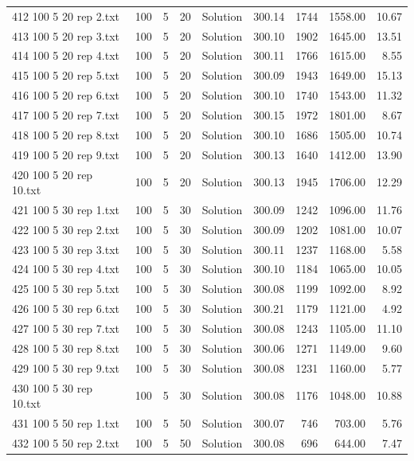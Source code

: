 \begin{longtable}{lrrllrrrr}
412 100 5 20 rep 2.txt & 100 & 5 & 20 & Solution & 300.14 & 1744 & 1558.00 & 10.67\\
413 100 5 20 rep 3.txt & 100 & 5 & 20 & Solution & 300.10 & 1902 & 1645.00 & 13.51\\
414 100 5 20 rep 4.txt & 100 & 5 & 20 & Solution & 300.11 & 1766 & 1615.00 &  8.55\\
415 100 5 20 rep 5.txt & 100 & 5 & 20 & Solution & 300.09 & 1943 & 1649.00 & 15.13\\
416 100 5 20 rep 6.txt & 100 & 5 & 20 & Solution & 300.10 & 1740 & 1543.00 & 11.32\\
417 100 5 20 rep 7.txt & 100 & 5 & 20 & Solution & 300.15 & 1972 & 1801.00 &  8.67\\
418 100 5 20 rep 8.txt & 100 & 5 & 20 & Solution & 300.10 & 1686 & 1505.00 & 10.74\\
419 100 5 20 rep 9.txt & 100 & 5 & 20 & Solution & 300.13 & 1640 & 1412.00 & 13.90\\
420 100 5 20 rep 10.txt & 100 & 5 & 20 & Solution & 300.13 & 1945 & 1706.00 & 12.29\\
421 100 5 30 rep 1.txt & 100 & 5 & 30 & Solution & 300.09 & 1242 & 1096.00 & 11.76\\
422 100 5 30 rep 2.txt & 100 & 5 & 30 & Solution & 300.09 & 1202 & 1081.00 & 10.07\\
423 100 5 30 rep 3.txt & 100 & 5 & 30 & Solution & 300.11 & 1237 & 1168.00 &  5.58\\
424 100 5 30 rep 4.txt & 100 & 5 & 30 & Solution & 300.10 & 1184 & 1065.00 & 10.05\\
425 100 5 30 rep 5.txt & 100 & 5 & 30 & Solution & 300.08 & 1199 & 1092.00 &  8.92\\
426 100 5 30 rep 6.txt & 100 & 5 & 30 & Solution & 300.21 & 1179 & 1121.00 &  4.92\\
427 100 5 30 rep 7.txt & 100 & 5 & 30 & Solution & 300.08 & 1243 & 1105.00 & 11.10\\
428 100 5 30 rep 8.txt & 100 & 5 & 30 & Solution & 300.06 & 1271 & 1149.00 &  9.60\\
429 100 5 30 rep 9.txt & 100 & 5 & 30 & Solution & 300.08 & 1231 & 1160.00 &  5.77\\
430 100 5 30 rep 10.txt & 100 & 5 & 30 & Solution & 300.08 & 1176 & 1048.00 & 10.88\\
431 100 5 50 rep 1.txt & 100 & 5 & 50 & Solution & 300.07 & 746 & 703.00 &  5.76\\
432 100 5 50 rep 2.txt & 100 & 5 & 50 & Solution & 300.08 & 696 & 644.00 &  7.47\\

\end{longtable}
